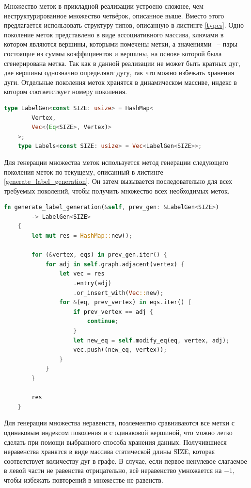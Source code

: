 \documentclass[14pt]{mmcs-article}
\begin{document}
Множество меток в прикладной реализации устроено сложнее, чем неструктурированное множество четвёрок, описанное выше. Вместо этого предлагается использовать структуру типов, описанную в листинге \ref{types}. Одно поколение меток представлено в виде ассоциативного массива, ключами в котором являются вершины, которыми помечены метки, а значениями ~-- пары состоящие из суммы коэффициентов и вершины, на основе которой была сгенерирована метка. Так как в данной реализации не может быть кратных дуг, две вершины однозначно определяют дугу, так что можно избежать хранения дуги. Отдельные поколения меток хранятся в динамическом массиве, индекс в котором соответствует номеру поколения.

\begin{lstlisting}[language=Rust, caption={ Метод генерации одного поколения меток. }, label=types] 
    type LabelGen<const SIZE: usize> = HashMap<
        Vertex,
        Vec<(Eq<SIZE>, Vertex)>
    >;
    type Labels<const SIZE: usize> = Vec<LabelGen<SIZE>>;
\end{lstlisting}

Для генерации множества меток используется метод генерации следующего поколения меток по текущему, описанный в листинге \ref{generate_label_generation}. Он затем вызывается последовательно для всех требуемых поколений, чтобы получить множество всех необходимых меток. 

\begin{lstlisting}[language=Rust, caption={ Метод генерации одного поколения меток. }, label=generate_label_generation]
    fn generate_label_generation(&self, prev_gen: &LabelGen<SIZE>)
        -> LabelGen<SIZE>
    {
        let mut res = HashMap::new();

        for (&vertex, eqs) in prev_gen.iter() {
            for adj in self.graph.adjacent(vertex) {
                let vec = res
                    .entry(adj)
                    .or_insert_with(Vec::new);
                for &(eq, prev_vertex) in eqs.iter() {
                    if prev_vertex == adj {
                        continue;
                    }
                    let new_eq = self.modify_eq(eq, vertex, adj);
                    vec.push((new_eq, vertex));
                }
            }
        }

        res
    }
\end{lstlisting}

Для генерации множества неравенств, поэлементно сравниваются все метки с одинаковым индексом поколения и с одинаковой вершиной, что можно легко сделать при помощи выбранного способа хранения данных. Получившиеся неравенства хранятся в виде массива статической длины SIZE, которая соответствует количеству дуг в графе. В случае, если первое ненулевое слагаемое в левой части не равенства отрицательно, всё неравенство умножается на $-1$, чтобы избежать повторений в множестве не равенств.
\end{document}
